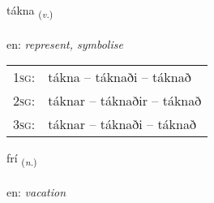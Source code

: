\documentclass[frontgrid, backgrid]{flacards}\usepackage[]{graphicx}\usepackage[]{color}
\begin{document}
\renewcommand{\blhead}{\vskip5pt {\small\bfseries\footnotesize Sagnorð | Verb }}
\renewcommand{\bcfoot}{\vskip5pt \hspace{2pt}{\small\bfseries\footnotesize 2K}}


{tákna \small{\textsubscript{(\textit{v.})}} \\[1ex] %
\textphonetic{[tʰauhkna]} \\
en: \emph{represent, symbolise} \\  [2ex]
\renewcommand*{\arraystretch}{0.8}
\begin{tabular}{p{1cm}l}
\textsc{1sg}: & tákna -- táknaði -- táknað \\ 
\textsc{2sg}: & táknar -- táknaðir -- táknað \\ 
\textsc{3sg}: & táknar -- táknaði -- táknað \\ 
\end{tabular}
}

\renewcommand{\flhead}{\vskip5pt \fboxsep=0pt {\small\bfseries\footnotesize Nafnorð | Noun}}
\renewcommand{\fcfoot}{\vskip5pt \fboxsep=0pt \hspace{2pt}{\small\bfseries\footnotesize 2K}}

\renewcommand{\blhead}{\vskip5pt {\small\bfseries\footnotesize Nafnorð | Noun }}
\renewcommand{\bcfoot}{\vskip5pt \hspace{2pt}{\small\bfseries\footnotesize 2K}}


{frí \small{\textsubscript{(\textit{n.})}} \\[1ex] %
\textphonetic{[friː]} \\
en: \emph{vacation} \\  [2ex]
\renewcommand*{\arraystretch}{0.8}
}

\renewcommand{\flhead}{\vskip5pt \fboxsep=0pt {\small\bfseries\footnotesize Sagnorð | Verb}}
\renewcommand{\fcfoot}{\vskip5pt \fboxsep=0pt \hspace{2pt}{\small\bfseries\footnotesize 2K}}
\end{document}
